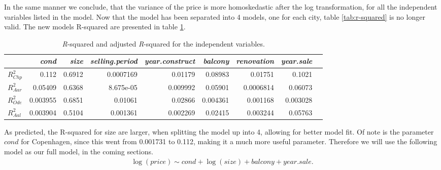 In the same manner we conclude, that the variance of the price is more homoskedastic after the log transformation, for all the independent variables listed in the model.
Now that the model has been separated into 4 models, one for each city, table \ref{tab:r-squared} is no longer valid.
The new models R-squared are presented in table \ref{tab:r-squared_4models}.

\begin{table}[H]
\centering
\footnotesize
\begin{tabular}{lrrrrrrrr}
\toprule
\textbf{}          & \textit{cond} & \textit{size} & \textit{selling.period} & \textit{year.construct} & \textit{balcony} & \textit{renovation}  & \textit{year.sale} \\
\midrule
$R^2_{Chp}$ & 0.112                & 0.6912              & 0.0007169           & 0.01179                  & 0.08983        & 0.01751      & 0.1021     \\
$R^2_{Aar}$ & 0.05409                & 0.6368              & 8.675e-05           & 0.009992                  & 0.05901        & 0.0006814        & 0.06073 \\
$R^2_{Ode}$ & 0.003955                & 0.6851              & 0.01061           & 0.02866                  & 0.004361        & 0.001168              & 0.003028 \\
$R^2_{Aal}$ & 0.003904                & 0.5104              & 0.001361           & 0.002269                  & 0.02415        & 0.003244              & 0.05763 \\
\bottomrule
\end{tabular}
\caption{\textit{R}-squared and adjusted \textit{R}-squared for the independent variables.}
\label{tab:r-squared_4models}
\end{table}
As predicted, the R-squared for size are larger, when splitting the model up into 4, allowing for better model fit.
Of note is the parameter $cond$ for Copenhagen, since this went from 0.001731 to 0.112, making it a much more useful parameter. 
Therefore we will use the following model as our full model, in the coming sections.
\begin{align*}
    \log(price) \sim \textit{cond} + \log(size)  + \textit{balcony} + year.sale.
\end{align*}

